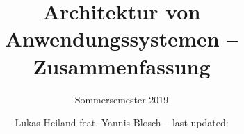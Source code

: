 \documentclass{scrreprt}
\begin{document}
	
	\title{Architektur von Anwendungssystemen -- Zusammenfassung}
	\subtitle{Sommersemester 2019}
	\author{Lukas Heiland feat. Yannis Blosch -- last updated:}
	
	\maketitle
	
	\pagebreak
	
	\setcounter{tocdepth}{2}
	\tableofcontents
	
	\pagebreak
	
	
	
	
		
		\pagebreak
		
	
	
		\pagebreak
		
	
	
		\pagebreak
		
	
	
		\pagebreak
		
	
	
		\pagebreak
		
	
\end{document}
